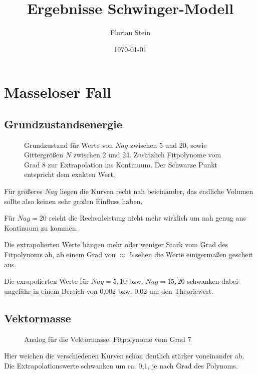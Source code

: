 \documentclass{article}
\title{Ergebnisse Schwinger-Modell}
\author{Florian Stein}
\date{\today}
\begin{document}
	\maketitle

\section{Masseloser Fall}
\subsection{Grundzustandsenergie}
 
\begin{figure}[H]
\centering
\hspace*{-0cm}
\caption{Grundzustand für Werte von $Nag$ zwischen 5 und 20, sowie Gittergrößen $N$ zwischen 2 und 24. Zusätzlich Fitpolynome vom Grad 8 zur Extrapolation ins Kontinuum. Der Schwarze Punkt entspricht dem exakten Wert.}
\end{figure}
Für größeres $Nag$ liegen die Kurven recht nah beieinander, das endliche Volumen sollte also keinen sehr großen Einfluss haben.

Für $Nag=20$ reicht die Rechenleistung nicht mehr wirklich um nah genug ans Kontinuum zu kommen.

Die extrapolierten Werte hängen mehr oder weniger Stark vom Grad des Fitpolynoms ab, ab einem Grad von $\approx$ 5 sehen die Werte einigermaßen gescheit aus.

Die exrapolierten Werte für $Nag=5,10$ bzw. $Nag=15,20$ schwanken dabei ungefähr in einem Bereich von 0,002  bzw. 0,02 um den Theoriewert.
\subsection{Vektormasse}

\begin{figure}[H]
	\centering
	\hspace*{-0cm}
	\caption{Analog für die Vektormasse. Fitpolynome vom Grad 7}
\end{figure}

Hier weichen die verschiedenen Kurven schon deutlich stärker voneinander ab. 
Die Extrapolationswerte schwanken um ca. 0,1, je nach Grad des Polynoms.
\end{document}
